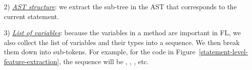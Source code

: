 2) {\em \underline{AST structure}}: we extract the sub-tree in the AST that
corresponds to the current statement.

3) {\em \underline{List of variables}}: because the variables in a method are
important in FL, we also collect the list of variables and their types
into a sequence. We then break them down into sub-tokens. For example,
for the code in Figure~\ref{statement-level-feature-extraction}, the
sequence will be , , , etc.





